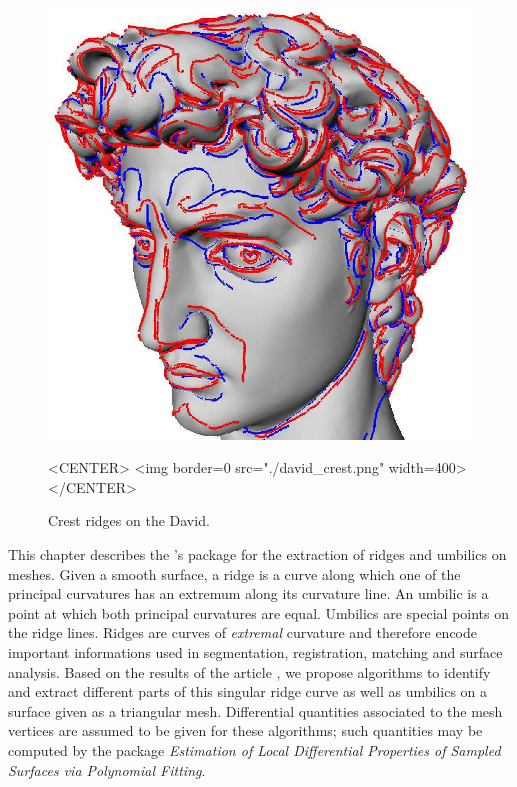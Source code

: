 

\newcommand{\FC}[1]{\protect{===FC SAYS: {#1}}}



\newtheorem{definition}{Definition.}
\newcommand{\hot}{h.o.t}%


\begin{figure}[!ht]
\begin{ccTexOnly}
\centerline{
\includegraphics[width=.5\linewidth]{Ridges_3/david_crest}}
\end{ccTexOnly}
\caption{Crest ridges on the David.}
\label{david-crest}
\begin{ccHtmlOnly}
<CENTER> <img border=0 src="./david_crest.png" width=400>
</CENTER>
\end{ccHtmlOnly}
\end{figure}

This chapter describes the \cgal's package for the extraction of
ridges and umbilics on meshes.  Given a smooth surface, a ridge is a
curve along which one of the principal curvatures has an extremum
along its curvature line. An umbilic is a point at which both
principal curvatures are equal. Umbilics are special points on the
ridge lines. Ridges are curves of {\em extremal} curvature and
therefore encode important informations used in segmentation,
registration, matching and surface analysis.  Based on the results of
the article \cite{cgal:cp-tdare-05}, we propose algorithms to identify
and extract different parts of this singular ridge curve as well as
umbilics on a surface given as a triangular mesh. Differential
quantities associated to the mesh vertices are assumed to be given for
these algorithms; such quantities may be computed by the package {\em
Estimation of Local Differential Properties of Sampled Surfaces via
Polynomial Fitting}.


